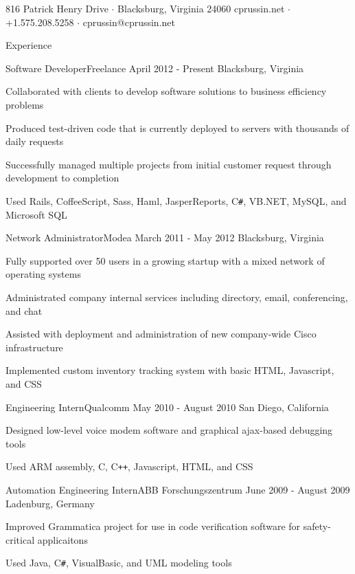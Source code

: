 \documentclass{resume}
\begin{document}
	           {816 Patrick Henry Drive $\cdot$ Blacksburg, Virginia 24060}
	           {cprussin.net $\cdot$ +1.575.208.5258 $\cdot$ cprussin@cprussin.net}

	\begin{section}{Experience}
		\begin{experience}{Software Developer}{Freelance}
		                  {April 2012 - Present}
		                  {Blacksburg, Virginia}
			\item Collaborated with clients to develop software solutions to business
			      efficiency problems
			\item Produced test-driven code that is currently deployed to servers
			      with thousands of daily requests
			\item Successfully managed multiple projects from initial customer
			      request through development to completion
			\item Used Rails, CoffeeScript, Sass, Haml, JasperReports, C\texttt{\#},
			      VB.NET, MySQL, and Microsoft SQL
		\end{experience}

		\begin{experience}{Network Administrator}{Modea}
		                  {March 2011 - May 2012}
		                  {Blacksburg, Virginia}
			\item Fully supported over 50 users in a growing startup with a mixed
			      network of operating systems
			\item Administrated company internal services including directory, email,
			      conferencing, and chat
			\item Assisted with deployment and administration of new company-wide
			      Cisco infrastructure
			\item Implemented custom inventory tracking system with basic HTML,
			      Javascript, and CSS
		\end{experience}

		\begin{experience}{Engineering Intern}{Qualcomm}
		                  {May 2010 - August 2010}
		                  {San Diego, California}
			\item Designed low-level voice modem software and graphical ajax-based
			      debugging tools
			\item Used ARM assembly, C, C\texttt{++}, Javascript, HTML, and CSS
		\end{experience}

		\begin{experience}{Automation Engineering Intern}{ABB Forschungszentrum}
		                  {June 2009 - August 2009}
		                  {Ladenburg, Germany}
			\item Improved Grammatica project for use in code verification software
			      for safety-critical applicaitons
			\item Used Java, C\texttt{\#}, VisualBasic, and UML modeling tools
		\end{experience}


\end{section}
\end{document}
